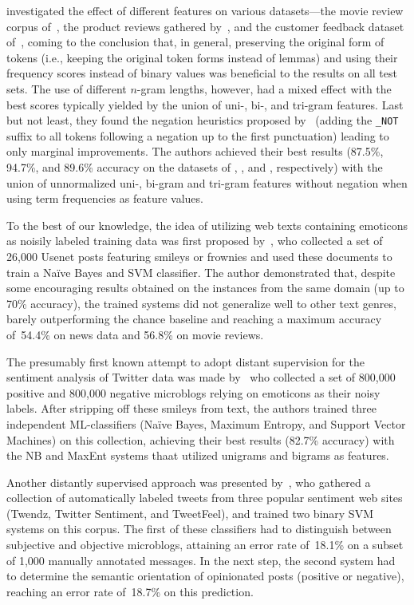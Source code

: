 \citet{Mejova:11} investigated the effect of different features on
various datasets---the movie review corpus of~\citet{Pang:04}, the
product reviews gathered by~\citet{Jindal:07}, and the customer
feedback dataset of~\citet{Blitzer:06}, coming to the conclusion that,
in general, preserving the original form of tokens (i.e., keeping the
original token forms instead of lemmas) and using their frequency
scores instead of binary values was beneficial to the results on all
test sets.  The use of different $n$-gram lengths, however, had a
mixed effect with the best scores typically yielded by the union of
uni-, bi-, and tri-gram features.  Last but not least, they found the
negation heuristics proposed by~\citet{Das:01} (adding the
\texttt{\_NOT} suffix to all tokens following a negation up to the
first punctuation) leading to only marginal improvements.  The authors
achieved their best results (87.5\%, 94.7\%, and 89.6\% accuracy on
the datasets of \citet{Pang:04}, \citet{Jindal:07}, and
\citet{Blitzer:06}, respectively) with the union of unnormalized uni-,
bi-gram and tri-gram features without negation when using term
frequencies as feature values.



\todo[inline]{}

To the best of our knowledge, the idea of utilizing web texts
containing emoticons as noisily labeled training data was first
proposed by~\citet{Read:05}, who collected a set of 26,000 Usenet
posts featuring smileys or frownies and used these documents to train
a Na{\"i}ve Bayes and SVM classifier.  The author demonstrated that,
despite some encouraging results obtained on the instances from the
same domain (up to 70\% accuracy), the trained systems did not
generalize well to other text genres, barely outperforming the chance
baseline and reaching a maximum accuracy of~54.4\% on news data and
56.8\% on movie reviews.

The presumably first known attempt to adopt distant supervision for
the sentiment analysis of Twitter data was made by~\citet{Go:09} who
collected a set of 800,000 positive and 800,000 negative microblogs
relying on emoticons as their noisy labels.  After stripping off these
smileys from text, the authors trained three independent
ML-classifiers (Na{\"i}ve Bayes, Maximum Entropy, and Support Vector
Machines) on this collection, achieving their best results (82.7\%
accuracy) with the NB and MaxEnt systems thaat utilized unigrams and
bigrams as features.

Another distantly supervised approach was presented
by~\citet{Barbosa:10}, who gathered a collection of automatically
labeled tweets from three popular sentiment web sites (Twendz, Twitter
Sentiment, and TweetFeel), and trained two binary SVM systems on this
corpus.  The first of these classifiers had to distinguish between
subjective and objective microblogs, attaining an error rate of~18.1\%
on a subset of 1,000 manually annotated messages.  In the next step,
the second system had to determine the semantic orientation of
opinionated posts (positive or negative), reaching an error rate
of~18.7\% on this prediction.

